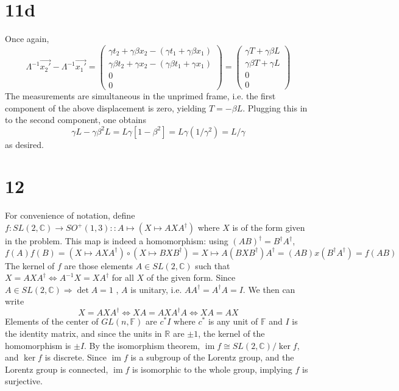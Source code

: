 \documentclass{article}
\DeclareMathOperator{\im}{im}
\begin{document}
\section*{11d}
Once again,
\[
  \Lambda^{-1}\vec{x_{2}'}-\Lambda^{-1}\vec{x_{1}'}
  =
  \begin{pmatrix}
    \gamma t_{2}+\gamma\beta x_{2}-(\gamma t_{1}+\gamma\beta x_{1}) \\
    \gamma\beta t_{2}+\gamma x_{2}-(\gamma\beta t_{1}+\gamma x_{1}) \\
    0 \\
    0
  \end{pmatrix}
  =
  \begin{pmatrix}
    \gamma T + \gamma\beta L \\
    \gamma \beta T + \gamma L \\
    0 \\
    0
  \end{pmatrix}
\]
The measurements are simultaneous in the unprimed frame, i.e. the first component of the above displacement is zero, yielding
$T=-\beta L$.
Plugging this in to the second component, one obtains
\[
  \gamma L-\gamma\beta^{2}L=L\gamma[1-\beta^{2}]=L\gamma(1/\gamma^{2})=L/\gamma
\]
as desired.

\section*{12}
For convenience of notation, define $f:SL(2,\mathbb{C})\to SO^{+}(1,3) :: A\mapsto (X\mapsto AXA^{\dagger})$ where $X$ is of the form
given in the problem.
This map is indeed a homomorphism: using $(AB)^{\dagger}=B^{\dagger}A^{\dagger}$,
\[
  f(A)f(B)=(X\mapsto AXA^{\dagger})\circ(X\mapsto BXB^{\dagger})=X\mapsto A(BXB^{\dagger})A^{\dagger}=(AB)x(B^{\dagger}A^{\dagger})
  =f(AB)
\]
The kernel of $f$ are those elements $A\in SL(2,\mathbb{C})$ such that $X=AXA^{\dagger}\Leftrightarrow A^{-1}X=XA^{\dagger}$ for all $X$ of
the given form.
Since $A\in SL(2,\mathbb{C})\Rightarrow \det A=1$ , $A$ is unitary, i.e. $AA^{\dagger}=A^{\dagger}A=I$.
We then can write
\[
  X=AXA^{\dagger}
  \Leftrightarrow XA=AXA^{\dagger}A
  \Leftrightarrow XA=AX
\]
Elements of the center of $GL(n,\mathbb{F})$ are $c^{*}I$ where $c^{*}$ is any unit of $\mathbb{F}$ and $I$ is the identity matrix, and
since the units in $\mathbb{R}$ are $\pm 1$, the kernel of the homomorphism is $\pm I$.
By the isomorphism theorem, $\im f\cong SL(2,\mathbb{C})/\ker f$, and $\ker f$ is discrete.
Since $\im f$ is a subgroup of the Lorentz group, and the Lorentz group is connected, $\im f$ is isomorphic to the whole group,
implying $f$ is surjective. %
\end{document}
